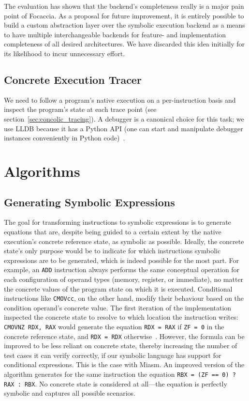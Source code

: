 The evaluation has shown that the backend's completeness really is a major pain point of Focaccia. As a proposal for
future improvement, it is entirely possible to build a custom abstraction layer over the symbolic execution backend as a
means to have multiple interchangeable backends for feature- and implementation completeness of all desired
architectures. We have discarded this idea initially for its likelihood to incur unnecessary effort.

\subsection{Concrete Execution Tracer}

We need to follow a program's native execution on a per-instruction basis and inspect the program's state at each trace
point (see section~\ref{sec:concolic_tracing}). A debugger is a canonical choice for this task; we use LLDB because it
has a Python API (one can start and manipulate debugger instances conveniently in Python code)~\cite{lldb2024Apr}.

\section{Algorithms}\label{sec:algorithms}

\subsection{Generating Symbolic Expressions}\label{sec:symb_expr_impl}

The goal for transforming instructions to symbolic expressions is to generate equations that are, despite being guided
to a certain extent by the native execution's concrete reference state, as symbolic as possible. Ideally, the concrete
state's only purpose would be to indicate for which instructions symbolic expressions are to be generated, which is
indeed possible for the most part. For example, an \texttt{ADD} instruction always performs the same conceptual
operation for each configuration of operand types (memory, register, or immediate), no matter the concrete values of the
program state on which it is executed. Conditional instructions like \texttt{CMOVcc}, on the other hand, modify their
behaviour based on the condition operand's concrete value. The first iteration of the implementation inspected the
concrete state to resolve to which location the instruction writes: \texttt{CMOVNZ RDX, RAX} would generate the equation
\texttt{RDX = RAX} if \texttt{ZF = 0} in the concrete reference state, and \texttt{RDX = RDX}
otherwise~\cite{Intel2023DeveloperManualVol1}.  However, the formula can be improved to be less reliant on concrete
state, thereby increasing the number of test cases it can verify correctly, if our symbolic language has support for
conditional expressions. This is the case with Miasm. An improved version of the algorithm generates for the same
instruction the equation \texttt{RBX = (ZF == 0) ? RAX : RBX}. No concrete state is considered at all---the equation is
perfectly symbolic and captures all possible scenarios.

